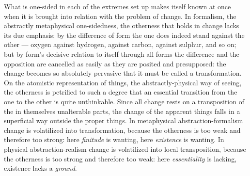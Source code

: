 \documentclass[12pt,a4paper]{book}
\begin{document}
What is one-sided in each of the extremes set up makes itself known at once
when it is brought into relation with the problem of change. In formalism, the
abstractly metaphysical one-sidedness, the otherness that holds in change lacks
its due emphasis; by the difference of form the one does indeed stand against
the other --- oxygen against hydrogen, against carbon, against sulphur, and so
on; but by form's decisive relation to itself through all forms the difference
and the opposition are cancelled as easily as they are posited and
presupposed:
the change becomes so absolutely pervasive that it must be called a
transformation. On the atomistic representation of things, the
abstractly-physical way of seeing, the otherness is petrified to such a degree
that an essential transition from the one to the other is quite unthinkable.
Since all change rests on a transposition of the in themselves unalterable
parts, the change of the apparent things falls in a superficial way outside the
proper things. In metaphysical abstraction-formalism change is volatilized into
transformation, because the otherness is too weak and therefore too strong:
here \emph{finitude} is wanting, here \emph{existence} is wanting. In physical
abstraction-realism change is volatilized into local transposition, because the
otherness is too strong and therefore too weak: here \emph{essentiality} is
lacking, existence lacks a \emph{ground}.
\end{document}
